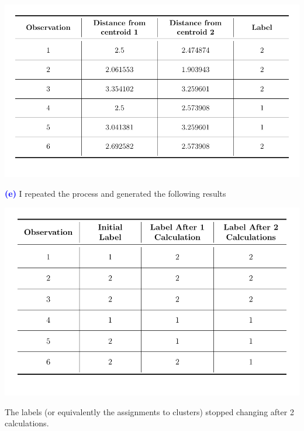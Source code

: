 \documentclass[a4paper,11pt]{article}
\newcommand{\qnum}[1]{\noindent\textcolor{blue}{\textbf{(#1)}}}
\begin{document}
\begin{center}
  \includegraphics[width=6in]{Table/Table2.pdf}
\end{center}



\qnum{e}
I repeated the process and generated the following results


\begin{center}
  \includegraphics[width=5.5in]{Table/Table3.pdf}
\end{center}
%
The labels (or equivalently the assignments to clusters) stopped changing after 2 calculations.
\bigskip\bigskip 
\end{document}
